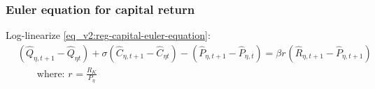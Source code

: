 \documentclass[../thesis.tex]{subfiles}
\begin{document}
\begin{comment}
	\subsubsection*{Region 1 Euler equation for the bonds return}
	
	Log-linearize \ref{eq_v2:reg-capital-euler-equation}:
	\begin{align}
		\frac{\mathbb{E}_{t} \left\{Q_{1, t+1} C_{1, t+1}^{\sigma} \right\}}{Q_{1t} C_{1t}^{\sigma}} &= \beta (1 + R_{t}) \tag{\ref{eq_v2:reg-capital-euler-equation}} \implies \\
		\hat{Q}_{1, t+1} - \hat{Q}_{1t} + \sigma (\hat{C}_{1, t+1} - \hat{C}_{1t}) &= (1 - \beta) \hat{R}_{t} \label{eq_v2:reg-bonds-euler-equation-ll}
	\end{align}

\subsubsection*{Euler equation for regional consumption}

Log-linearize \ref{eq_v2:reg-capital-euler-equation} and then substitute \ref{eq_v2:reg-total-expense-level-2-ll}:
\begin{align}
	& \frac{\mathbb{E}_{t} \left\{ Q_{1, t+1} C_{1, t+1}^{\sigma} \right\}}{Q_{1t} C_{1t}^{\sigma}} = \frac{\mathbb{E}_{t} \left\{ Q_{2, t+1} C_{2, t+1}^{\sigma} \right\}}{Q_{2t} C_{2t}^{\sigma}} \tag{\ref{eq_v2:reg-bonds-euler-equation-2}} \implies \\
	& \hat{Q}_{1, t+1} - \hat{Q}_{1t} + \sigma (\hat{C}_{1, t+1} - \hat{C}_{1t}) = \nonumber \\ 
	&\qquad = \hat{Q}_{2, t+1} - \hat{Q}_{2t} + \sigma (\hat{C}_{2, t+1} - \hat{C}_{2t}) \implies \nonumber \\
	& \hat{C}_{1, t+1} - \hat{C}_{1t} = \hat{C}_{2, t+1} - \hat{C}_{2t} \label{eq_v2:reg-bonds-euler-equation-2-ll}
\end{align}

\end{comment}

\subsubsection*{Euler equation for capital return}

Log-linearize \ref{eq_v2:reg-capital-euler-equation}:
\begin{align}
	& (\hat{Q}_{\eta, t+1} - \hat{Q}_{\eta t}) + \sigma(\hat{C}_{\eta, t+1} - \hat{C}_{\eta t}) - (\hat{P}_{\eta, t+1} - \hat{P}_{\eta, t}) = \beta r_{}(\hat{R}_{\eta, t+1} - \hat{P}_{\eta, t+1}) \label{eq_v2:reg-ll-capital-euler-equation} \\
	& \qquad \text{where: } r_{} = \frac{R_{K}}{P_{\eta}} \label{eq_v2:reg-rk}
\end{align}
\end{document}
